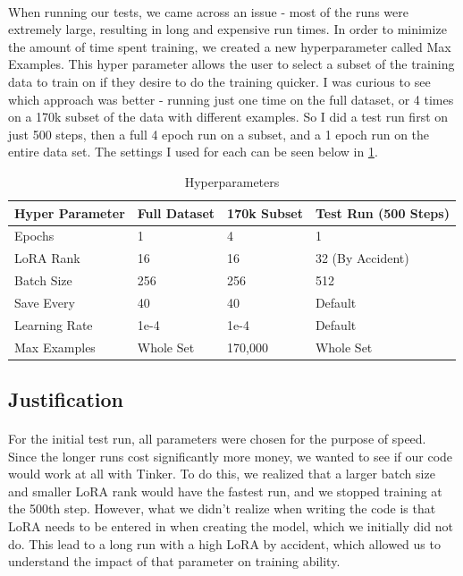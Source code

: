 \documentclass[11pt]{article}
\begin{document}
\paragraph{}When running our tests, we came across an issue - most of the runs were extremely large, resulting in long and expensive run times. In order to minimize the amount of time spent training, we created a new hyperparameter called Max Examples. This hyper parameter allows the user to select a subset of the training data to train on if they desire to do the training quicker. I was curious to see which approach was better - running just one time on the full dataset, or 4 times on a 170k subset of the data with different examples. So I did a test run first on just 500 steps, then a full 4 epoch run on a subset, and a 1 epoch run on the entire data set. The settings I used for each can be seen below in \ref{tab1}.

\begin{table}[h!]
\centering
\begin{tabular}{p{3cm}p{3.5cm}p{3.5cm}p{3.5cm}}
\toprule
\textbf{Hyper Parameter} & \textbf{Full Dataset}  & \textbf{170k Subset} & \textbf{Test Run (500 Steps)} \\
\midrule
Epochs & 1 & 4 & 1\\
LoRA Rank & 16 & 16 & 32 (By Accident) \\
Batch Size & 256 & 256 & 512 \\
Save Every & 40 & 40 & Default \\
Learning Rate & 1e-4 & 1e-4 & Default \\
Max Examples & Whole Set & 170,000 & Whole Set \\
\bottomrule
\end{tabular}
\caption{Hyperparameters}
\label{tab1}
\end{table}

\subsection{Justification}
\paragraph{}For the initial test run, all parameters were chosen for the purpose of speed. Since the longer runs cost significantly more money, we wanted to see if our code would work at all with Tinker. To do this, we realized that a larger batch size and smaller LoRA rank would have the fastest run, and we stopped training at the 500th step. However, what we didn't realize when writing the code is that LoRA needs to be entered in when creating the model, which we initially did not do. This lead to a long run with a high LoRA by accident, which allowed us to understand the impact of that parameter on training ability.
\end{document}
